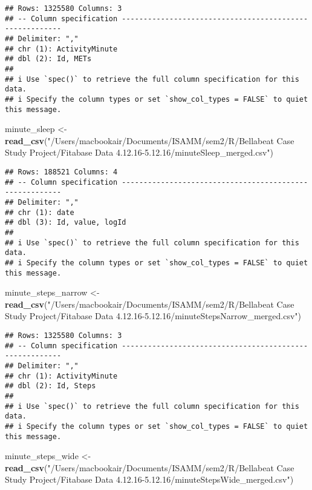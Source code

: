 \documentclass[
]{article}
\newenvironment{Shaded}{\begin{snugshade}}{\end{snugshade}}
\newcommand{\FunctionTok}[1]{\textcolor[rgb]{0.13,0.29,0.53}{\textbf{#1}}}
\newcommand{\NormalTok}[1]{#1}
\newcommand{\OtherTok}[1]{\textcolor[rgb]{0.56,0.35,0.01}{#1}}
\newcommand{\StringTok}[1]{\textcolor[rgb]{0.31,0.60,0.02}{#1}}
\begin{document}
\begin{verbatim}
## Rows: 1325580 Columns: 3
## -- Column specification --------------------------------------------------------
## Delimiter: ","
## chr (1): ActivityMinute
## dbl (2): Id, METs
## 
## i Use `spec()` to retrieve the full column specification for this data.
## i Specify the column types or set `show_col_types = FALSE` to quiet this message.
\end{verbatim}

\begin{Shaded}
\begin{Highlighting}[]
\NormalTok{minute\_sleep }\OtherTok{\textless{}{-}} \FunctionTok{read\_csv}\NormalTok{(}\StringTok{"/Users/macbookair/Documents/ISAMM/sem2/R/Bellabeat Case Study Project/Fitabase Data 4.12.16{-}5.12.16/minuteSleep\_merged.csv"}\NormalTok{)}
\end{Highlighting}
\end{Shaded}

\begin{verbatim}
## Rows: 188521 Columns: 4
## -- Column specification --------------------------------------------------------
## Delimiter: ","
## chr (1): date
## dbl (3): Id, value, logId
## 
## i Use `spec()` to retrieve the full column specification for this data.
## i Specify the column types or set `show_col_types = FALSE` to quiet this message.
\end{verbatim}

\begin{Shaded}
\begin{Highlighting}[]
\NormalTok{minute\_steps\_narrow }\OtherTok{\textless{}{-}} \FunctionTok{read\_csv}\NormalTok{(}\StringTok{"/Users/macbookair/Documents/ISAMM/sem2/R/Bellabeat Case Study Project/Fitabase Data 4.12.16{-}5.12.16/minuteStepsNarrow\_merged.csv"}\NormalTok{)}
\end{Highlighting}
\end{Shaded}

\begin{verbatim}
## Rows: 1325580 Columns: 3
## -- Column specification --------------------------------------------------------
## Delimiter: ","
## chr (1): ActivityMinute
## dbl (2): Id, Steps
## 
## i Use `spec()` to retrieve the full column specification for this data.
## i Specify the column types or set `show_col_types = FALSE` to quiet this message.
\end{verbatim}

\begin{Shaded}
\begin{Highlighting}[]
\NormalTok{minute\_steps\_wide }\OtherTok{\textless{}{-}} \FunctionTok{read\_csv}\NormalTok{(}\StringTok{"/Users/macbookair/Documents/ISAMM/sem2/R/Bellabeat Case Study Project/Fitabase Data 4.12.16{-}5.12.16/minuteStepsWide\_merged.csv"}\NormalTok{)}
\end{Highlighting}
\end{Shaded}
\end{document}
